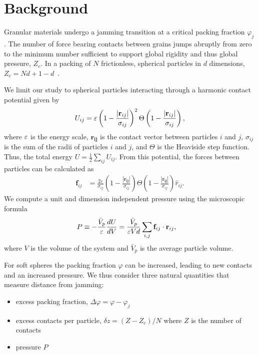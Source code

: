 \section{Background} Granular materials undergo a jamming transition at a critical packing fraction $\varphi_j$. The number of force bearing contacts between grains jumps abruptly from zero to the minimum number sufficient to support global rigidity and thus global pressure, $Z_c$. In a packing of $N$ frictionless, spherical particles in $d$ dimensions, $Z_c = Nd + 1 - d$~\cite{liu_jamming_2010, goodrich_finite-size_2012}.

We limit our study to spherical particles interacting through a harmonic contact potential given by 
%
 \begin{equation}
  U_{ij}= \varepsilon \left(1-\frac{|\mathbf{r}_{ij}|}{\sigma_{ij}}\right)^2 \Theta\left(1-\frac{|\mathbf{r}_{ij}|}{\sigma_{ij}}\right),
 \end{equation}
%
where $\varepsilon$ is the energy scale, $\mathbf{r_{ij}}$ is the contact vector between particles $i$ and $j$, $\sigma_{ij}$ is the sum of the radii of particles $i$ and $j$, and $\Theta$ is the Heaviside step function. Thus, the total energy $U= \frac{1}{2}\sum_{ij} U_{ij}$.
From this potential, the forces between particles can be calculated as
%
\begin{align}
 \mathbf{f}_{ij} &= \frac{2 \varepsilon}{\sigma_{ij}} \left(1-\frac{|\mathbf{r_{ij}}|}{\sigma_{ij}}\right) \Theta\left(1-\frac{|\mathbf{r_{ij}}|}{\sigma_{ij}}\right) \hat{r}_{ij}.
\end{align}
%
We compute a unit and dimension independent pressure using the microscopic formula \cite{ohern_jamming_2003,allen_computer_1989}
%
\begin{align}
 \label{eqn:stress_tensor_definition}
 P &\equiv -\frac{\bar{V}_p}{\varepsilon}\frac{dU}{dV}= \frac{\bar{V}_p}{\varepsilon Vd} \sum_{i,j} \mathbf{f}_{ij} \cdot \mathbf{r}_{ij}, 
 \end{align}
where $V$ is the volume of the system and $\bar{V}_p$ is the average particle volume. 


For soft spheres the packing fraction $\varphi$ can be increased, leading to new contacts and an increased pressure. We thus consider three natural quantities that measure distance from jamming:
\begin{itemize}
 \item excess packing fraction, $\Delta \varphi = \varphi - \varphi_j$
 \item excess contacts per particle, $\delta z=\left(Z-Z_c\right) / N$ where $Z$ is the number of contacts
 \item pressure $P$
\end{itemize}



